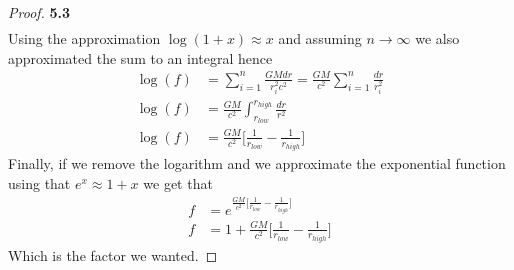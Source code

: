 \documentclass[11pt]{article}
\theoremstyle{definition}
\begin{document}
\begin{proof}{\textbf{5.3}}
\begin{align*}
    \end{align*}
    Using the approximation $\log(1 + x) \approx x$ and assuming $n \to \infty$ 
    we also approximated the sum to an integral hence
    \begin{align*}
        \log(f) &= \sum_{i=1}^n \frac{GMdr}{r_i^2c^2} = \frac{GM}{c^2}\sum_{i=1}^n \frac{dr}{r_i^2}\\
        \log(f) &= \frac{GM}{c^2} \int_{r_{low}}^{r_{high}} \frac{dr}{r^2}\\
        \log(f) &= \frac{GM}{c^2} \bigg[\frac{1}{r_{low}} - \frac{1}{r_{high}}\bigg]
    \end{align*}
    \cleardoublepage
    Finally, if we remove the logarithm and we approximate the exponential
    function using that $e^x \approx 1 +x$ we get that
    \begin{align*}
        f &= e^{\frac{GM}{c^2} \big[\frac{1}{r_{low}} - \frac{1}{r_{high}}\big]}\\
        f &= 1 + \frac{GM}{c^2} \bigg[\frac{1}{r_{low}} - \frac{1}{r_{high}}\bigg]
    \end{align*}
    Which is the factor we wanted.
\end{proof}
\end{document}
